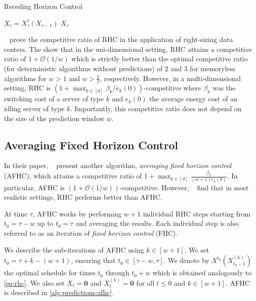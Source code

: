 \begin{algorithm}
    \caption{Receding Horizon Control~\cite{Lin2012}}\label{alg:predictions:rhc}
    $X_{\tau} = X_{\tau}^{\tau}(X_{\tau-1})$\;
    \Return $X_{\tau}$\;
\end{algorithm}

\citeauthor*{Lin2012}~\cite{Lin2012} prove the competitive ratio of RHC in the application of right-sizing data centers. The show that in the uni-dimensional setting, RHC attains a competitive ratio of $1 + \mathcal{O}(1/w)$ which is strictly better than the optimal competitive ratio (for deterministic algorithms without predictions) of $2$ and $3$ for memoryless algorithms for $w > 1$ and $w > \frac{1}{2}$, respectively. However, in a multi-dimensional setting, RHC is $(1 + \max_{k \in [d]} \beta_k / e_k(0))$-competitive where $\beta_k$ was the switching cost of a server of type $k$ and $e_k(0)$ the average energy cost of an idling server of type $k$. Importantly, this competitive ratio does not depend on the size of the prediction window $w$.

\subsection{Averaging Fixed Horizon Control}

In their paper, \citeauthor*{Lin2012}~\cite{Lin2012} present another algorithm, \emph{averaging fixed horizon control} (AFHC), which attains a competitive ratio of $1 + \max_{k \in [d]} \frac{\beta_k}{(w+1) e_k(0)}$. In particular, AFHC is $(1 + \mathcal{O}(1/w))$-competitive. However, \citeauthor*{Lin2012}~\cite{Lin2012} find that in most realistic settings, RHC performs better than AFHC.

At time $\tau$, AFHC works by performing $w + 1$ individual RHC steps starting from $t_0 = \tau-w$ up to $t_0 = \tau$ and averaging the results. Each individual step is also referred to as an iteration of \emph{fixed horizon control} (FHC).

We describe the sub-iterations of AFHC using $k \in [w+1]$. We set $t_0 = \tau+k-(w+1)$, ensuring that $t_0 \in [\tau-w,\tau]$. We denote by $X^{t_0}(X_{t_0-1}^{(k)})$ the optimal schedule for times $t_0$ through $t_0+w$ which is obtained analogously to \cref{eq:rhc}. We also set $X_t = \mathbf{0}$ and $X_t^{(k)} = \mathbf{0}$ for all $t \leq 0$ and $k \in [w+1]$. AFHC is described in \cref{alg:predictions:afhc}.


